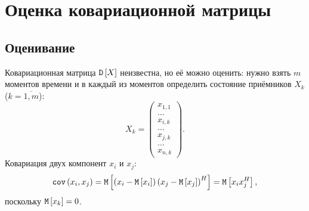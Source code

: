 \chapter{Оценка ковариационной матрицы}

\section{Оценивание}

Ковариационная матрица $\mathtt{D} \left [ X \right ]$ неизвестна, но её можно оценить: нужно взять $m$ моментов времени и в каждый из моментов определить состояние приёмников $X_k$
($k = \overline{1,m}$):
\[
    X_k =
    \begin{pmatrix}
        x_{1,1} \\
        \dots   \\
        x_{i,k} \\
        \dots   \\
        x_{j,k} \\
        \dots   \\
        x_{n,k}
    \end{pmatrix} .
\]
Ковариация двух компонент $x_i$ и $x_j$:
\[
    \mathtt{cov} \left ( x_i, x_j \right )
    = \mathtt{M} \left [ \left ( x_i - \mathtt{M} \left [ x_i \right ] \right ) \left ( x_j - \mathtt{M} \left [ x_j \right ] \right )^H \right ]
    = \mathtt{M} \left [  x_i x_j^H \right ],
\]
поскольку $\mathtt{M} \left [ x_k \right ] = 0$.

